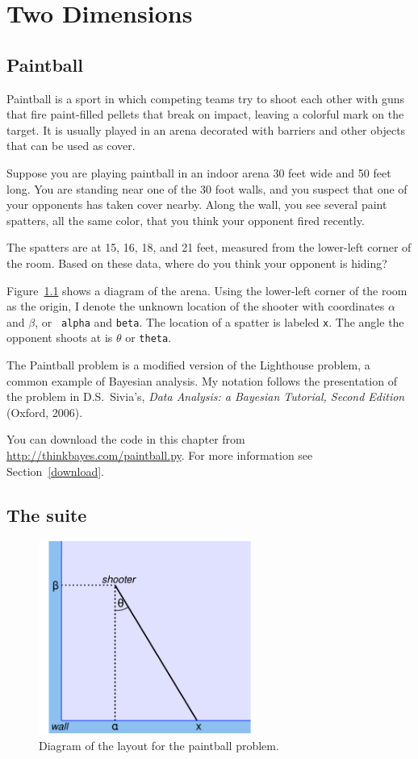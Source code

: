 \documentclass[12pt]{book}
\theoremstyle{exercise}
\begin{document}
\chapter{Two Dimensions}
\label{paintball}

\section{Paintball}

Paintball is a sport in which competing teams try to shoot each other
with guns that fire paint-filled pellets that break on impact, leaving
a colorful mark on the target.  It is usually played in an
arena decorated with barriers and other objects that can be
used as cover.

Suppose you are playing paintball in an indoor arena 30 feet
wide and 50 feet long.  You are standing near one of the 30 foot
walls, and you suspect that one of your opponents has taken cover
nearby.  Along the wall, you see several paint spatters, all the same
color, that you think your opponent fired recently.

The spatters are at 15, 16, 18, and 21 feet, measured from the
lower-left corner of the room.  Based on these data, where do you
think your opponent is hiding?

Figure~\ref{fig.paintball} shows a diagram of the arena.  Using the
lower-left corner of the room as the origin, I denote the unknown
location of the shooter with coordinates $\alpha$ and $\beta$, or {\tt
  alpha} and {\tt beta}.  The location of a spatter is labeled
{\tt x}.  The angle the opponent shoots at is $\theta$ or {\tt theta}.

The Paintball problem is a modified version
of the Lighthouse problem, a common example of Bayesian analysis.  My
notation follows the presentation of the problem in D.S.~Sivia's, {\it Data
  Analysis: a Bayesian Tutorial, Second Edition} (Oxford, 2006).

You can download the code in this chapter from
\url{http://thinkbayes.com/paintball.py}.  For more information see
Section~\ref{download}.


\section{The suite}

\begin{figure}
\centerline{\includegraphics[height=2.5in]{figs/paintball.pdf}}
\caption{Diagram of the layout for the paintball problem.}
\label{fig.paintball}
\end{figure}
\end{document}
